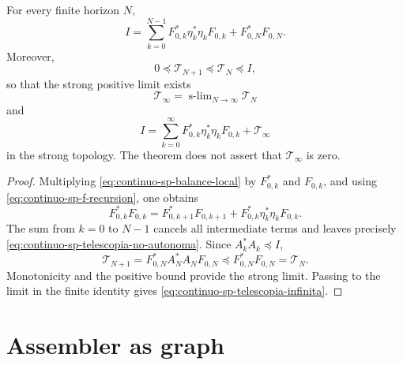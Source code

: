 \begin{theorem}
\label{thm:continuo-sp-telescopia-no-autonoma}
For every finite horizon \(N\),
\begin{equation}
\label{eq:continuo-sp-telescopia-no-autonoma}
 \boxed{
 I=\sum_{k=0}^{N-1}
 F_{0,k}^*\eta_k^*\eta_kF_{0,k}
 +F_{0,N}^*F_{0,N}.}
\end{equation}
Moreover,
\[
 0\preceq\mathcal T_{N+1}
 \preceq\mathcal T_N\preceq I,
\]
so that the strong positive limit exists
\[
 \mathcal T_\infty
 =\operatorname{s-lim}_{N\to\infty}\mathcal T_N
\]
and
\begin{equation}
\label{eq:continuo-sp-telescopia-infinita}
 I=\sum_{k=0}^{\infty}
 F_{0,k}^*\eta_k^*\eta_kF_{0,k}
 +\mathcal T_\infty
\end{equation}
in the strong topology. The theorem does not assert that
\(\mathcal T_\infty\) is zero.
\end{theorem}

\begin{proof}
Multiplying \eqref{eq:continuo-sp-balance-local} by
\(F_{0,k}^*\) and \(F_{0,k}\), and using
\eqref{eq:continuo-sp-f-recursion}, one obtains
\[
 F_{0,k}^*F_{0,k}
 =F_{0,k+1}^*F_{0,k+1}
  +F_{0,k}^*\eta_k^*\eta_kF_{0,k}.
\]
The sum from \(k=0\) to \(N-1\) cancels all intermediate
terms and leaves precisely
\eqref{eq:continuo-sp-telescopia-no-autonoma}. Since
\(A_k^*A_k\preceq I\),
\[
 \mathcal T_{N+1}
 =F_{0,N}^*A_N^*A_NF_{0,N}
 \preceq F_{0,N}^*F_{0,N}=\mathcal T_N.
\]
Monotonicity and the positive bound provide the strong limit. Passing to the
limit in the finite identity gives
\eqref{eq:continuo-sp-telescopia-infinita}.
\end{proof}

\section{Assembler as graph}

